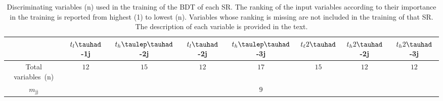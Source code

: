 \documentclass[PAPER, coverpage, atlasdraft=true, texlive=2016, UKenglish]{\ATLASLATEXPATH atlasdoc}
\providecommand{\DIFadd}[1]{{\protect\color{blue}\uwave{#1}}} %
\providecommand{\DIFdel}[1]{{\protect\color{red}\sout{#1}}}                      %
\providecommand{\DIFaddFL}[1]{\DIFadd{#1}} %
\providecommand{\DIFdelFL}[1]{\DIFdel{#1}} %
\providecommand{\DIFaddbeginFL}{} %
\providecommand{\DIFaddendFL}{} %
\providecommand{\DIFdelbeginFL}{} %
\providecommand{\DIFdelendFL}{} %
\begin{document}
\begin{table}[t!]
  \caption{\DIFdelbeginFL %
\DIFdelendFL \DIFaddbeginFL \small{Discriminating variables (n) used in the training of the BDT of each SR. 
The ranking of the input variables according to their importance in the training is reported from highest (1) to 
lowest (n). Variables whose ranking is missing are not included in the training of that SR. The description of each variable is provided in the text.}\DIFaddendFL }
\label{tab:importance}
 \centering
 \DIFaddbeginFL \vspace{0.2cm}
 \DIFaddendFL \begin{tabular}{cccccccc} \toprule\toprule
   & \DIFdelbeginFL \DIFdelFL{$t_{l}\tauhad$}\DIFdelendFL \DIFaddbeginFL \DIFaddFL{$t_{\ell}\tauhad$}\DIFaddendFL -1j                                  &  $t_{h}\tlhad$-2j   &  \DIFdelbeginFL \DIFdelFL{$t_{l}\tauhad$}\DIFdelendFL \DIFaddbeginFL \DIFaddFL{$t_{\ell}\tauhad$}\DIFaddendFL -2j & $t_{h}\tlhad$-3j & $t_{\ell}2\tauhad$     & $t_h2\tauhad$-2j & $t_h2\tauhad$-3j       \\\midrule
   Total variables~(n)                           & $12$\DIFaddbeginFL \DIFaddFL{~~ }\DIFaddendFL & $15$\DIFaddbeginFL \DIFaddFL{~~ }\DIFaddendFL & $12$\DIFaddbeginFL \DIFaddFL{~~ }\DIFaddendFL & $17$\DIFaddbeginFL \DIFaddFL{~~ }\DIFaddendFL & $15$\DIFaddbeginFL \DIFaddFL{~~ }\DIFaddendFL & $12$\DIFaddbeginFL \DIFaddFL{~~ }\DIFaddendFL & $12$\DIFaddbeginFL \DIFaddFL{~~ }\DIFaddendFL \\\midrule
   \DIFdelbeginFL \DIFdelFL{$m_{\text{jj}}$                                      }\DIFdelendFL \DIFaddbeginFL \DIFaddFL{$\met$                                              }\DIFaddendFL & \DIFaddbeginFL \DIFaddFL{$5$       }\DIFaddendFL &  \DIFaddbeginFL \DIFaddFL{$11$~~               }\DIFaddendFL &  \DIFaddbeginFL \DIFaddFL{$10$~~             }\DIFaddendFL & \DIFdelbeginFL \DIFdelFL{$9$      }\DIFdelendFL \DIFaddbeginFL \DIFaddFL{$13$~~     }\DIFaddendFL & \DIFdelbeginFL %

\end{tabular}
\end{table}
\end{document}
